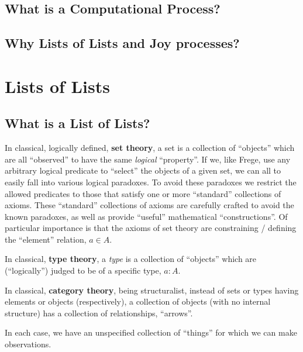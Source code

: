 \documentclass[a4paper,openany]{amsart}
\begin{document}
\subsection{What is a Computational Process?}

\subsection{Why Lists of Lists and Joy processes?}

\section{Lists of Lists}

\subsection{What is a List of Lists?} 


In classical, logically defined, \textbf{set theory}, a set is a collection of
``objects'' which are all ``observed'' to have the same \emph{logical}
``property''. If we, like Frege, use any arbitrary logical predicate to
``select'' the objects of a given set, we can all to easily fall into various
logical paradoxes. To avoid these paradoxes we restrict the allowed predicates
to those that satisfy one or more ``standard'' collections of axioms. These
``standard'' collections of axioms are carefully crafted to avoid the known
paradoxes, as well as provide ``useful'' mathematical ``constructions''. Of
particular importance is that the axioms of set theory are constraining /
defining the ``element'' relation, $a \in A$.


In classical, \textbf{type theory}, a \emph{type} is a collection of ``objects''
which are (``logically'') judged to be of a specific type, $a:A$.

In classical, \textbf{category theory}, being structuralist, instead of sets or
types having elements or objects (respectively), a collection of objects (with
no internal structure) has a collection of relationships, ``arrows''. 

In each case, we have an unspecified collection of ``things'' for which we can
make observations.
\end{document}
